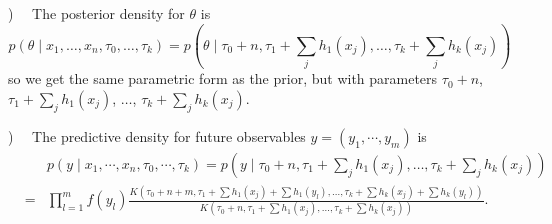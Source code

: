 \documentclass[12pt]{article}
\def\ni{\noindent}
\begin{document}
\ni 1) ~~The posterior density for $\theta$ is
$$p(\theta\mid x_1,\ldots,x_n,\tau_0,\ldots,\tau_k)=p(\theta\mid \tau_0+n,\tau_1+\sum_j h_1(x_j),\ldots,\tau_k+\sum_j
h_k(x_j))$$
so we get the same parametric form as the prior, but with parameters
$\tau_0+n$, $\tau_1+\sum_j h_1(x_j)$, $\ldots$, $\tau_k+\sum_j h_k(x_j)$.

\ni 2) ~~The predictive density for future observables
  $y=(y_1,\cdots,y_m)$ is 
\begin{eqnarray*}
&&p(y\mid x_1,\cdots,x_n,\tau_0,\cdots,\tau_k)= p(y\mid \tau_0+n,\tau_1+\sum_j h_1(x_j),\ldots,\tau_k+\sum_j
h_k(x_j))\\
&=&\prod_{l=1}^m f(y_l) \frac{K( \tau_0+n+m,\tau_1+\sum h_1(x_j)+\sum
h_1(y_l), \ldots,\tau_k+\sum h_k(x_j)+\sum h_k(y_l)) }{K(\tau_0+n,\tau_1+\sum h_1(x_j),\ldots,\tau_k+\sum h_k(x_j))}.
\end{eqnarray*}
\end{document}
